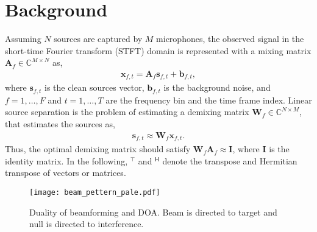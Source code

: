 \documentclass[a4paper]{article}
\def\C{{\mathbb C}}
\begin{document}
\section{Background}
\label{sec:background}

Assuming $N$ sources are captured by $M$ microphones, the observed signal in the short-time Fourier transform (STFT) domain is represented with a mixing matrix $\bm{A}_{f}\in\C^{{M}\times{N}}$ as,
\begin{align}
  \label{eqn:signal_model}
    \bm{x}_{f,t} = {\bm{A}_f}{\bm{s}_{f,t}} + {\bm{b}_{f,t}},
\end{align}
where $\bm{s}_{f,t}$ is the clean sources vector, $\bm{b}_{f,t}$ is the background noise, and ${f} = {1,\ldots,F}$ and ${t} = {1,\ldots,T}$ are the frequency bin and the time frame index. 
Linear source separation is the problem of estimating a demixing matrix $\bm{W}_{f} \in \C^{{N}\times{M}}$, that estimates the sources as,
\begin{align}
  \label{eqn:separation}
    \bm{s}_{f,t} \approx {\bm{W}_f}{\bm{x}_{f,t}}.
\end{align}
Thus, the optimal demixing matrix should satisfy ${\bm{W}_f}{\bm{A}_f} \approx\bm{I}$, where $\bm{I}$ is the identity matrix.
In the following, $^\top{}$ and $^{\mathsf{H}}$ denote the transpose and Hermitian transpose of vectors or matrices.

\begin{figure}[t]
\centering
\centerline{\texttt{[image: beam\_pettern\_pale.pdf]}}
\vspace{-2mm}
\caption{Duality of beamforming and DOA. Beam is directed to target and null is directed to interference.}
\label{fig:beamforming}
\vspace{-3mm}
\end{figure}
\end{document}
